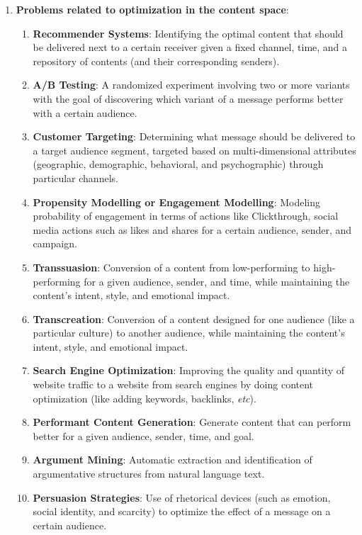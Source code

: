 \begin{enumerate}
\item \textbf{Problems related to optimization in the content space}:
    \begin{enumerate}
        \item \textbf{Recommender Systems}: Identifying the optimal content that should be delivered next to a certain receiver given a fixed channel, time, and a repository of contents (and their corresponding senders).
        \item \textbf{A/B Testing}: A randomized experiment involving two or more variants with the goal of discovering which variant of a message performs better with a certain audience.
        \item \textbf{Customer Targeting}: Determining what message should be delivered to a target audience segment, targeted based on multi-dimensional attributes (geographic, demographic, behavioral, and psychographic) through particular channels.

        \item \textbf{Propensity Modelling or Engagement Modelling}: Modeling probability of engagement in terms of actions like Clickthrough, social media actions such as likes and shares for a certain audience, sender, and campaign.
        \item \textbf{Transsuasion}: Conversion of a content from low-performing to high-performing for a given audience, sender, and time, while maintaining the content's intent, style, and emotional impact.
        \item \textbf{Transcreation}: Conversion of a content designed for one audience (like a particular culture) to another audience, while maintaining the content's intent, style, and emotional impact.
        \item \textbf{Search Engine Optimization}: Improving the quality and quantity of website traffic to a website from search engines by doing content optimization (like adding keywords, backlinks, \textit{etc}).
        \item \textbf{Performant Content Generation}: Generate content that can perform better for a given audience, sender, time, and goal.
        \item \textbf{Argument Mining}: Automatic extraction and identification of argumentative structures from natural language text.
        \item \textbf{Persuasion Strategies}: Use of rhetorical devices (such as emotion, social identity, and scarcity) to optimize the effect of a message on a certain audience.
    \end{enumerate}


\end{enumerate}
